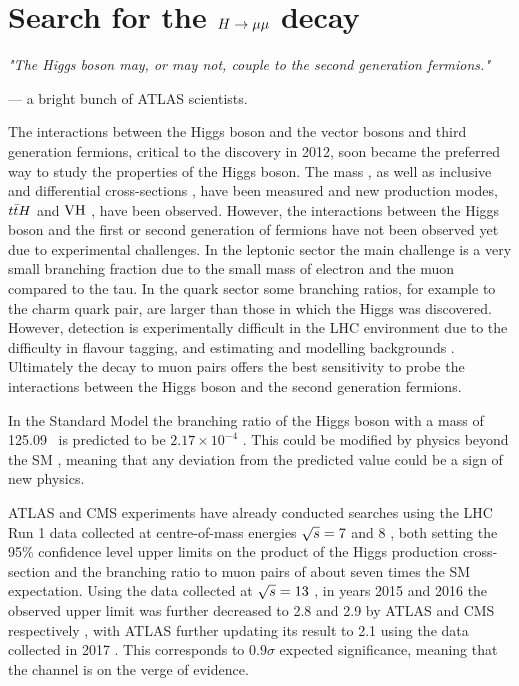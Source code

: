 \chapter{Search for the $H \rightarrow \mu\mu$ decay}

\textit{"The Higgs boson may, or may not, couple to the second generation fermions."}

\vspace{5mm}
\begin{flushright}
--- a bright bunch of ATLAS scientists.
\end{flushright}

\thispagestyle{empty}
\newpage

The interactions between the Higgs boson and the vector bosons and
third generation fermions, critical to the discovery in 2012, soon 
became the preferred way to study the properties of the Higgs boson.
The mass \cite{Aad:2015zhl, Aaboud:2018wps, CMS-PAS-HIG-19-004},
as well as inclusive and differential cross-sections
\cite{Aad_2015, Chatrchyan_2014, Aaboud:2017oem, Sirunyan:2018sgc, Aaboud:2018ezd},
have been measured and new production modes, $t\bar{t} H$ \cite{Sirunyan:2018hoz, Aaboud:2018urx}
and $\text{VH}$ \cite{Sirunyan:2018kst, Aaboud:2018zhk}, have been 
observed. However, the interactions between the Higgs boson
and the first or second generation of fermions have not been
observed yet due to experimental challenges. In the leptonic
sector the main challenge is a very small branching fraction due
to the small mass of electron and the muon compared to the tau.
In the quark sector some branching ratios, for example to the charm
quark pair, are larger than those in which the Higgs was discovered.
However, detection is experimentally difficult in the LHC environment
due to the difficulty in flavour tagging, and estimating and modelling
backgrounds \cite{Aaboud:2018fhh, CMS-PAS-HIG-18-031}. Ultimately the
decay to muon pairs offers the best sensitivity to probe the
interactions between the Higgs boson and the second generation
fermions.

In the Standard Model the branching ratio of the Higgs boson with a
mass of 125.09 \GeV~is predicted to be $2.17 \times 10^{-4}$
\cite{deFlorian:2016spz}. This could be modified by physics beyond the
SM \cite{Giudice:2008uua, Dery:2013rta, PhysRevD.80.095023}, meaning
that any deviation from the predicted value could be a sign of new
physics.

ATLAS and CMS experiments have already conducted searches using
the LHC Run 1 data collected at centre-of-mass energies $\sqrt{s} = 7$
and 8 \TeV, both setting the 95\% confidence level upper limits on the
product of the Higgs production cross-section and the branching ratio
to muon pairs \cite{Aad:2014xva, Khachatryan:2014aep} of about seven
times the SM expectation. Using the data collected at $\sqrt{s} = 13$
\TeV, in years 2015 and 2016 the observed upper limit was further
decreased to 2.8 and 2.9 by ATLAS and CMS respectively
\cite{Aaboud:2017ojs, CMS-PAS-HIG-17-019}, with ATLAS
further updating its result to 2.1 using the data collected in 2017
\cite{ATLAS-CONF-2018-026}. This corresponds to $0.9 \sigma$ expected
significance, meaning that the channel is on the verge of evidence.

